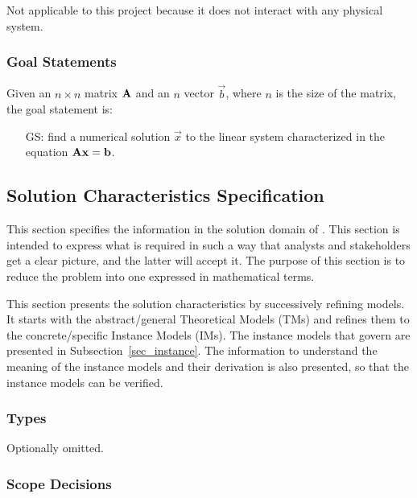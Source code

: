\documentclass[12pt]{article}
\newcounter{goalnum} %
\begin{document}
Not applicable to this project because it does not interact with any physical
system.

\subsubsection{Goal Statements}

\noindent Given an \(n \times n\) matrix \(\mathbf{A}\) and an \(n\) vector \(\vec{b}\),
where \(n\) is the size of the matrix, the goal statement is:

\begin{itemize}
\item[GS\refstepcounter{goalnum}\thegoalnum \label{GS:Axb}:] find a numerical
  solution \(\vec{x}\) to the linear system characterized in the equation
  \(\mathbf{A}\mathbf{x} = \mathbf{b}\).
\end{itemize}

\subsection{Solution Characteristics Specification}

This section specifies the information in the solution domain of \progname. This
section is intended to express what is required in such a way that analysts and
stakeholders get a clear picture, and the latter will accept it. The purpose of
this section is to reduce the problem into one expressed in mathematical terms.

This section presents the solution characteristics by successively refining
models. It starts with the abstract/general Theoretical Models (TMs) and refines
them to the concrete/specific Instance Models (IMs). The instance models that
govern \progname are presented in Subsection~\ref{sec_instance}. The
information to understand the meaning of the instance models and their
derivation is also presented, so that the instance models can be verified.

\subsubsection{Types}


Optionally omitted.

\subsubsection{Scope Decisions}
\end{document}
